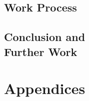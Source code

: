 \documentclass[a4paper]{report}
\begin{document}
\chapter{Work Process}
	

\chapter{Conclusion and \protect\\ Further Work}

\printglossaries

\part{Appendices}
	



\nocite{*}
\end{document}
